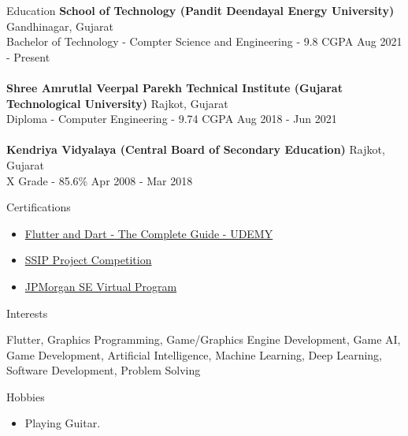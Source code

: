 \documentclass{resume} %
\begin{document}
\begin{rSection}{Education}
{\bf School of Technology (Pandit Deendayal Energy University)} \hfill {Gandhinagar, Gujarat}\\
Bachelor of Technology - Compter Science and Engineering - 9.8 CGPA \hfill {Aug 2021 - Present}\\
\\
{\bf Shree Amrutlal Veerpal Parekh Technical Institute (Gujarat Technological University)} \hfill {Rajkot, Gujarat}\\
Diploma - Computer Engineering - 9.74 CGPA \hfill {Aug 2018 - Jun 2021}\\
\\
{\bf Kendriya Vidyalaya (Central Board of Secondary Education)} \hfill {Rajkot, Gujarat}\\
X Grade - 85.6\% \hfill {Apr 2008 - Mar 2018}
\end{rSection}

\begin{rSection}{Certifications} 
\begin{itemize}
    \item   \href{https://www.udemy.com/certificate/UC-2fce7723-1cc7-403d-a54b-09dbd5cd495e/}{Flutter and Dart - The Complete Guide - UDEMY}
    \item   \href{https://jaynakum.github.io/assets/Achievements/SSIP.jpg}{SSIP Project Competition}
    \item   \href{https://jaynakum.github.io/assets/Achievements/JPMC.jpg}{JPMorgan SE Virtual Program}
\end{itemize}
\end{rSection}

\begin{rSection}{Interests} 
\begin{itemize}
    Flutter, Graphics Programming, Game/Graphics Engine Development, Game AI, Game Development, Artificial Intelligence, Machine Learning, Deep Learning, Software Development, Problem Solving
\end{itemize}
\end{rSection}

\begin{rSection}{Hobbies} 
\begin{itemize}
    \item 	Playing Guitar.
\end{itemize}
\end{rSection}
\end{document}
